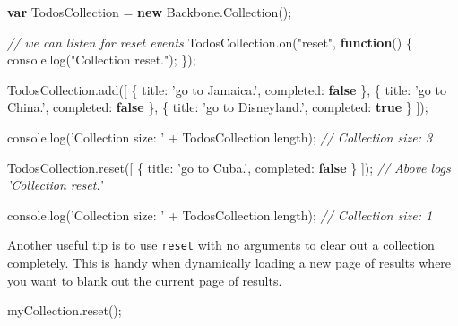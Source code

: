 \documentclass[9pt]{book}
\newenvironment{Shaded}{}{}
\newcommand{\KeywordTok}[1]{\textcolor[rgb]{0.00,0.44,0.13}{\textbf{{#1}}}}
\newcommand{\DataTypeTok}[1]{\textcolor[rgb]{0.56,0.13,0.00}{{#1}}}
\newcommand{\StringTok}[1]{\textcolor[rgb]{0.25,0.44,0.63}{{#1}}}
\newcommand{\CommentTok}[1]{\textcolor[rgb]{0.38,0.63,0.69}{\textit{{#1}}}}
\newcommand{\OtherTok}[1]{\textcolor[rgb]{0.00,0.44,0.13}{{#1}}}
\newcommand{\FunctionTok}[1]{\textcolor[rgb]{0.02,0.16,0.49}{{#1}}}
\newcommand{\NormalTok}[1]{{#1}}
\begin{document}
\begin{Shaded}
\begin{Highlighting}[]
\KeywordTok{var} \NormalTok{TodosCollection = }\KeywordTok{new} \OtherTok{Backbone}\NormalTok{.}\FunctionTok{Collection}\NormalTok{();}

\CommentTok{// we can listen for reset events}
\OtherTok{TodosCollection}\NormalTok{.}\FunctionTok{on}\NormalTok{(}\StringTok{"reset"}\NormalTok{, }\KeywordTok{function}\NormalTok{() \{}
  \OtherTok{console}\NormalTok{.}\FunctionTok{log}\NormalTok{(}\StringTok{"Collection reset."}\NormalTok{);}
\NormalTok{\});}

\OtherTok{TodosCollection}\NormalTok{.}\FunctionTok{add}\NormalTok{([}
  \NormalTok{\{ }\DataTypeTok{title}\NormalTok{: }\StringTok{'go to Jamaica.'}\NormalTok{, }\DataTypeTok{completed}\NormalTok{: }\KeywordTok{false} \NormalTok{\},}
  \NormalTok{\{ }\DataTypeTok{title}\NormalTok{: }\StringTok{'go to China.'}\NormalTok{, }\DataTypeTok{completed}\NormalTok{: }\KeywordTok{false} \NormalTok{\},}
  \NormalTok{\{ }\DataTypeTok{title}\NormalTok{: }\StringTok{'go to Disneyland.'}\NormalTok{, }\DataTypeTok{completed}\NormalTok{: }\KeywordTok{true} \NormalTok{\}}
\NormalTok{]);}

\OtherTok{console}\NormalTok{.}\FunctionTok{log}\NormalTok{(}\StringTok{'Collection size: '} \NormalTok{+ }\OtherTok{TodosCollection}\NormalTok{.}\FunctionTok{length}\NormalTok{); }\CommentTok{// Collection size: 3}

\OtherTok{TodosCollection}\NormalTok{.}\FunctionTok{reset}\NormalTok{([}
  \NormalTok{\{ }\DataTypeTok{title}\NormalTok{: }\StringTok{'go to Cuba.'}\NormalTok{, }\DataTypeTok{completed}\NormalTok{: }\KeywordTok{false} \NormalTok{\}}
\NormalTok{]);}
\CommentTok{// Above logs 'Collection reset.'}

\OtherTok{console}\NormalTok{.}\FunctionTok{log}\NormalTok{(}\StringTok{'Collection size: '} \NormalTok{+ }\OtherTok{TodosCollection}\NormalTok{.}\FunctionTok{length}\NormalTok{); }\CommentTok{// Collection size: 1}
\end{Highlighting}
\end{Shaded}

Another useful tip is to use \texttt{reset} with no arguments to clear
out a collection completely. This is handy when dynamically loading a
new page of results where you want to blank out the current page of
results.

\begin{Shaded}
\begin{Highlighting}[]
\OtherTok{myCollection}\NormalTok{.}\FunctionTok{reset}\NormalTok{();}
\end{Highlighting}
\end{Shaded}
\end{document}
